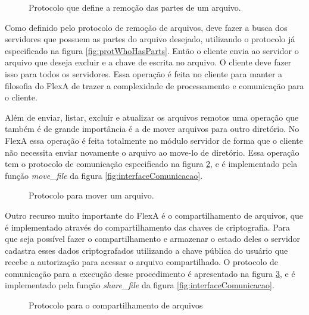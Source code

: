         \begin{figure}[!ht]
        \caption{Protocolo que define a remoção das partes de um arquivo.}
        \label{fig:protRemoveFile}
        \end{figure}
        
        
        Como definido pelo protocolo de remoção de arquivos, deve fazer a busca dos servidores que possuem as partes do arquivo desejado, utilizando o protocolo já especificado na figura \ref{fig:protWhoHasParts}. Então o cliente envia ao servidor o arquivo que deseja excluir e a chave de escrita no arquivo. O cliente deve fazer isso para todos os servidores. Essa operação é feita no cliente para manter a filosofia do FlexA de trazer a complexidade de processamento e comunicação para o cliente.
        
        Além de enviar, listar, excluir e atualizar os arquivos remotos uma operação que também é de grande importância é a de mover arquivos para outro diretório. No FlexA essa operação é feita totalmente no módulo servidor de forma que o cliente não necessita enviar novamente o arquivo ao move-lo de diretório. Essa operação tem o protocolo de comunicação especificado na figura \ref{fig:protMoveFile}, e é implementado pela função \textit{move\_file} da figura \ref{fig:interfaceComunicacao}.
        
        \begin{figure}[!ht]
        \caption{Protocolo para mover um arquivo.}
        \label{fig:protMoveFile}
        \end{figure}
        
        
        Outro recurso muito importante do FlexA é o compartilhamento de arquivos, que é implementado através do compartilhamento das chaves de criptografia. Para que seja possível fazer o compartilhamento e armazenar o estado deles o servidor cadastra esses dados criptografados utilizando a chave pública do usuário que recebe a autorização para acessar o arquivo compartilhado. O protocolo de comunicação para a execução desse procedimento é apresentado na figura \ref{fig:protShareFile}, e é implementado pela função \textit{share\_file} da figura \ref{fig:interfaceComunicacao}.
        
        \begin{figure}[!ht]
        \caption{Protocolo para o compartilhamento de arquivos}
        \label{fig:protShareFile}
        \end{figure}
        
